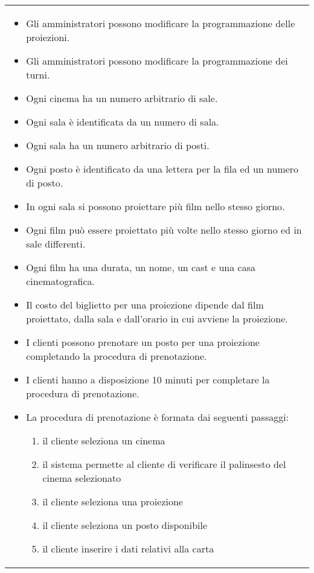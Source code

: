 \begin{tabularx}{\linewidth}{|X|}
    \hline
    \begin{itemize}
        \item Gli amministratori possono modificare la programmazione delle
              proiezioni.
        \item Gli amministratori possono modificare la programmazione dei turni.
        \item Ogni cinema ha un numero arbitrario di sale.
        \item Ogni sala è identificata da un numero di sala.
        \item Ogni sala ha un numero arbitrario di posti.
        \item Ogni posto è identificato da una lettera per la fila ed un numero
              di posto.
        \item In ogni sala si possono proiettare più film nello stesso giorno.
        \item Ogni film può essere proiettato più volte nello stesso giorno ed
              in sale differenti.
        \item Ogni film ha una durata, un nome, un cast e una
              casa cinematografica.
        \item Il costo del biglietto per una proiezione dipende dal film
              proiettato, dalla sala e dall'orario in cui avviene la proiezione.
        \item I clienti possono prenotare un posto per una proiezione
              completando la procedura di prenotazione.
        \item I clienti hanno a disposizione 10 minuti per completare la
              procedura di prenotazione.
        \item La procedura di prenotazione è formata dai seguenti passaggi:
              \begin{enumerate}
                  \item il cliente seleziona un cinema
                  \item il sistema permette al cliente di verificare
                        il palinsesto del cinema selezionato
                  \item il cliente seleziona una proiezione
                  \item il cliente seleziona un posto disponibile
                  \item il cliente inserire i dati relativi alla carta

\end{enumerate}
\end{itemize}
\end{tabularx}
